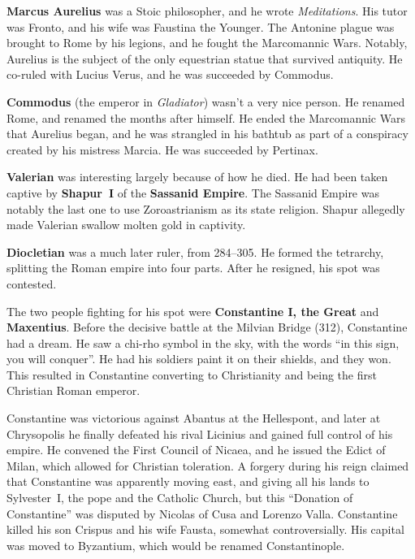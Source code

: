 \textbf{Marcus Aurelius} was a Stoic philosopher, and he wrote \textit{Meditations}.
His tutor was Fronto, and his wife was Faustina the Younger.
The Antonine plague was brought to Rome by his legions,
and he fought the Marcomannic Wars.
Notably, Aurelius is the subject of the only equestrian statue that survived antiquity.
He co-ruled with Lucius Verus, and he was succeeded by Commodus.

\textbf{Commodus} (the emperor in \textit{Gladiator}) wasn't a very nice person.
He renamed Rome, and renamed the months after himself.
He ended the Marcomannic Wars that Aurelius began, and he was strangled in his bathtub
as part of a conspiracy created by his mistress Marcia.
He was succeeded by Pertinax.

\textbf{Valerian} was interesting largely because of how he died.
He had been taken captive by \textbf{Shapur~I} of the \textbf{Sassanid Empire}.
The Sassanid Empire was notably the last one to use Zoroastrianism as its state religion.
Shapur allegedly made Valerian swallow molten gold in captivity.

\textbf{Diocletian} was a much later ruler, from 284--305.
He formed the tetrarchy, splitting the Roman empire into four parts.
After he resigned, his spot was contested.

The two people fighting for his spot were \textbf{Constantine I, the Great} and \textbf{Maxentius}.
Before the decisive battle at the Milvian Bridge (312), Constantine had a dream.
He saw a chi-rho symbol in the sky, with the words ``in this sign, you will conquer''.
He had his soldiers paint it on their shields, and they won.
This resulted in Constantine converting to Christianity and being the first Christian Roman emperor.

Constantine was victorious against Abantus at the Hellespont,
and later at Chrysopolis he finally defeated his rival Licinius and gained full control of his empire.
He convened the First Council of Nicaea, and he issued the Edict of Milan,
which allowed for Christian toleration.
A forgery during his reign claimed that Constantine was apparently moving east,
and giving all his lands to Sylvester~I, the pope and the Catholic Church,
but this ``Donation of Constantine'' was disputed by Nicolas of Cusa and Lorenzo Valla.
Constantine killed his son Crispus and his wife Fausta, somewhat controversially.
His capital was moved to Byzantium, which would be renamed Constantinople.
